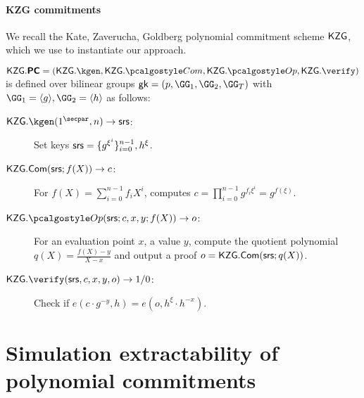 \documentclass[runningheads,11pt]{llncs}
\begin{document}
\paragraph{KZG commitments}
We recall the Kate, Zaverucha, Goldberg polynomial commitment scheme $\mathsf{KZG}$, which we use to instantiate our approach.

$\Kzg.\PC = (\Kzg.\kgen, \Kzg.\com, \Kzg.\open, \Kzg.\verify)$ is defined over bilinear groups $\gk=(p,\GG_1,\allowbreak \GG_2, \allowbreak \GG_T )$ with $\GG_1 =\langle g\rangle, \GG_2 =\langle h \rangle$ as follows:
\begin{description}%
\item[$\Kzg.\kgen(1^\secpar, n) \to \srs$:] Set keys
$\mathsf{srs} = \{g^{\xi^i}\}_{i=0}^{n-1}, h^\xi$.
\item[$\mathsf{KZG}.{\sf Com}(\mathsf{srs}; f(X)) \to c$:] For
  $f(X) = \sum_{i=0}^{n-1} f_i X^i$, computes
  $c=\prod _{i=0}^{n-1} g^{f_i \xi^i} = g^{f(\xi)} $.
\item[$\Kzg.\open(\srs; c, x, y; f(X)) \to o$:] For an evaluation point
  $x$, a value $y$, compute the quotient polynomial
  $q(X) = \displaystyle\frac{f(X) -y }{X-x}$ and output a proof
  $o = \mathsf{KZG}.{\sf Com}(\mathsf{srs}; q(X)) $.
\item[$\Kzg.\verify(\srs, c, x, y, o) \to 1/0$:] Check if
  $e(c \cdot g^{-y}, h)=e(o , h^{\xi}\cdot h^{-x})$.
\end{description}





\section{Simulation extractability of polynomial commitments}
\end{document}
